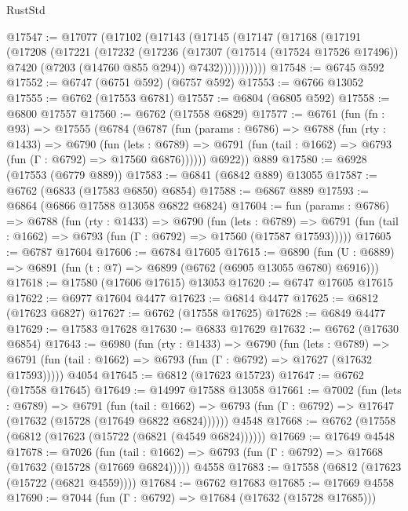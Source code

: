 \begin{lexlean}{RustStd}
\begin{coremodule}
@17547 := @17077
    (@17102
      (@17143
        (@17145
          (@17147
            (@17168
              (@17191
                (@17208
                  (@17221
                    (@17232
                      (@17236
                        (@17307
                          (@17514 (@17524 @17526 @17496))
                          @7420
                          (@7203 (@14760 @855 @294))
                          @7432)))))))))))
@17548 := @6745 @592
@17552 := @6747 (@6751 @592) (@6757 @592)
@17553 := @6766 @13052
@17555 := @6762 (@17553 @6781)
@17557 := @6804 (@6805 @592)
@17558 := @6800 @17557
@17560 := @6762 (@17558 @6829)
@17577 := @6761
    (fun (fn : @93) =>
    @17555
      (@6784
        (@6787
          (fun (params : @6786) =>
          @6788
            (fun (rty : @1433) =>
            @6790
              (fun (lets : @6789) =>
              @6791 (fun (tail : @1662) => @6793 (fun (Γ : @6792) => @17560 @6876))))))
        @6922))
    @889
@17580 := @6928 (@17553 (@6779 @889))
@17583 := @6841 (@6842 @889) @13055
@17587 := @6762 (@6833 (@17583 @6850) @6854)
@17588 := @6867 @889
@17593 := @6864 (@6866 @17588 @13058 @6822 @6824)
@17604 := fun (params : @6786) =>
  @6788
    (fun (rty : @1433) =>
    @6790
      (fun (lets : @6789) =>
      @6791 (fun (tail : @1662) => @6793 (fun (Γ : @6792) => @17560 (@17587 @17593)))))
@17605 := @6787 @17604
@17606 := @6784 @17605
@17615 := @6890
    (fun (U : @6889) => @6891 (fun (t : @7) => @6899 (@6762 (@6905 @13055 @6780) @6916)))
@17618 := @17580 (@17606 @17615) @13053
@17620 := @6747 @17605 @17615
@17622 := @6977 @17604 @4477
@17623 := @6814 @4477
@17625 := @6812 (@17623 @6827)
@17627 := @6762 (@17558 @17625)
@17628 := @6849 @4477
@17629 := @17583 @17628
@17630 := @6833 @17629
@17632 := @6762 (@17630 @6854)
@17643 := @6980
    (fun (rty : @1433) =>
    @6790
      (fun (lets : @6789) =>
      @6791 (fun (tail : @1662) => @6793 (fun (Γ : @6792) => @17627 (@17632 @17593)))))
    @4054
@17645 := @6812 (@17623 @15723)
@17647 := @6762 (@17558 @17645)
@17649 := @14997 @17588 @13058
@17661 := @7002
    (fun (lets : @6789) =>
    @6791
      (fun (tail : @1662) =>
      @6793 (fun (Γ : @6792) => @17647 (@17632 (@15728 (@17649 @6822 @6824))))))
    @4548
@17668 := @6762 (@17558 (@6812 (@17623 (@15722 (@6821 (@4549 @6824))))))
@17669 := @17649 @4548
@17678 := @7026
    (fun (tail : @1662) => @6793 (fun (Γ : @6792) => @17668 (@17632 (@15728 (@17669 @6824)))))
    @4558
@17683 := @17558 (@6812 (@17623 (@15722 (@6821 @4559))))
@17684 := @6762 @17683
@17685 := @17669 @4558
@17690 := @7044 (fun (Γ : @6792) => @17684 (@17632 (@15728 @17685)))

\end{coremodule}
\end{lexlean}
